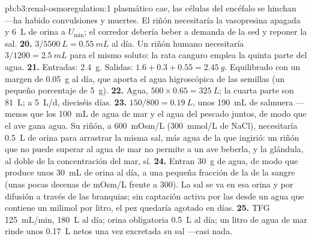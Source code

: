 \begin{solution}{pb:b3:renal-osmoregulation:1}
plasmático cae, las células del encéfalo se hinchan ---ha habido
convulsiones y muertes. El riñón necesitaría la vasopresina apagada y
\qty{6}{L} de orina a $U_{\min}$; el corredor debería beber a demanda
de la sed y reponer la sal.
\textbf{20.} $3/5500\ \unit{L} = \qty{0.55}{mL}$ al día. Un riñón humano
necesitaría $3/1200 = \qty{2.5}{mL}$ para el mismo soluto: la rata
canguro emplea la quinta parte del agua.
\textbf{21.} Entradas: \qty{2.4}{g}. Salidas:
$1.6 + 0.3 + 0.55 = \qty{2.45}{g}$. Equilibrado con un margen de
\qty{0.05}{g} al día, que aporta el agua higroscópica de las semillas
(un pequeño porcentaje de \qty{5}{g}).
\textbf{22.} Agua, $500\times 0.65 = \qty{325}{L}$; la cuarta parte son
\qty{81}{L}; a \qty{5}{L/d}, dieciséis días.
\textbf{23.} $150/800 = \qty{0.19}{L}$, unos \qty{190}{mL} de salmuera
---menos que los \qty{100}{mL} de agua de mar y el agua del pescado
juntos, de modo que el ave gana agua. Su riñón, a \qty{600}{mOsm/L}
(\qty{300}{mmol/L} de NaCl), necesitaría \qty{0.5}{L} de orina para
arrastrar la misma sal, más agua de la que ingirió: un riñón que no
puede superar al agua de mar no permite a un ave beberla, y la
glándula, al doble de la concentración del mar, sí.
\textbf{24.} Entran \qty{30}{g} de agua, de modo que produce unos
\qty{30}{mL} de orina al día, a una pequeña fracción de la 
de la sangre (unas pocas decenas de mOsm/L frente a \num{300}). La sal
se va en esa orina y por difusión a través de las branquias; sin
captación activa por las  desde un agua que contiene
un milimol por litro, el pez quedaría agotado en días.
\textbf{25.} TFG \qty{125}{mL/min}, \qty{180}{L} al día; orina
obligatoria \qty{0.5}{L} al día; un litro de agua de mar rinde unos
\qty{0.17}{L} netos una vez excretada su sal ---casi nada.
\end{solution}
